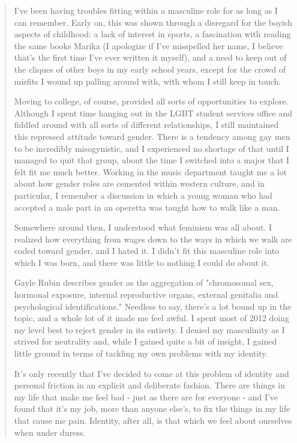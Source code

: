 \begin{paracol}{2}
\begin{leftcolumn}
\begin{quotation}
I've been having troubles fitting within a masculine role for as long as I can remember.  Early on, this was shown through a disregard for the boyish aspects of childhood: a lack of interest in sports, a fascination with reading the same books Marika (I apologize if I've misspelled her name, I believe that's the first time I've ever written it myself), and a need to keep out of the cliques of other boys in my early school years, except for the crowd of misfits I wound up palling around with, with whom I still keep in touch.

Moving to college, of course, provided all sorts of opportunities to explore.  Although I spent time hanging out in the LGBT student services office and fiddled around with all sorts of different relationships, I still maintained this repressed attitude toward gender.  There is a tendency among gay men to be incredibly misogynistic, and I experienced no shortage of that until I managed to quit that group, about the time I switched into a major that I felt fit me much better.  Working in the music department taught me a lot about how gender roles are cemented within western culture, and in particular, I remember a discussion in which a young woman who had accepted a male part in an operetta was taught how to walk like a man.

Somewhere around then, I understood what feminism was all about.  I realized how everything from wages down to the ways in which we walk are coded toward gender, and I hated it.  I didn't fit this masculine role into which I was born, and there was little to nothing I could do about it.

Gayle Rubin describes gender as the aggregation of "chromosomal sex, hormonal exposure, internal reproductive organs, external genitalia and psychological identifications." Needless to say, there's a lot bound up in the topic, and a whole lot of it made me feel awful.  I spent most of 2012 doing my level best to reject gender in its entirety.  I denied my masculinity as I strived for neutrality and, while I gained quite a bit of insight, I gained little ground in terms of tackling my own problems with my identity.

It's only recently that I've decided to come at this problem of identity and personal friction in an explicit and deliberate fashion.  There are things in my life that make me feel bad - just as there are for everyone - and I've found that it's my job, more than anyone else's, to fix the things in my life that cause me pain.  Identity, after all, is that which we feel about ourselves when under duress.


\end{quotation}
\end{leftcolumn}
\end{paracol}
